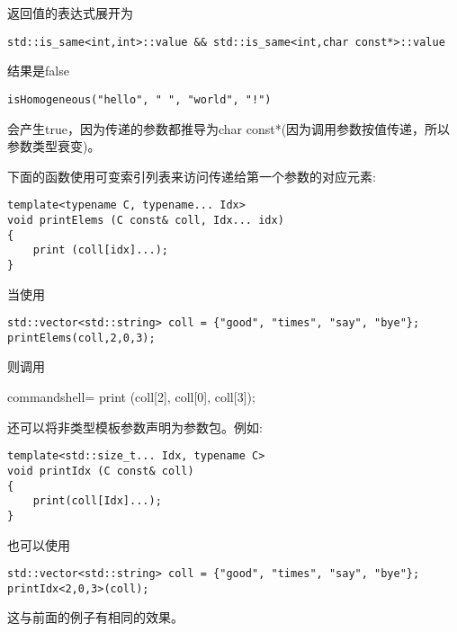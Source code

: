 返回值的表达式展开为

\begin{lstlisting}[style=styleCXX]
std::is_same<int,int>::value && std::is_same<int,char const*>::value
\end{lstlisting}

结果是false

\begin{lstlisting}[style=styleCXX]
isHomogeneous("hello", " ", "world", "!")
\end{lstlisting}

会产生true，因为传递的参数都推导为char const*(因为调用参数按值传递，所以参数类型衰变)。


下面的函数使用可变索引列表来访问传递给第一个参数的对应元素:

\begin{lstlisting}[style=styleCXX]
template<typename C, typename... Idx>
void printElems (C const& coll, Idx... idx)
{
	print (coll[idx]...);
}
\end{lstlisting}

当使用

\begin{lstlisting}[style=styleCXX]
std::vector<std::string> coll = {"good", "times", "say", "bye"};
printElems(coll,2,0,3);
\end{lstlisting}

则调用

\begin{tcblisting}{commandshell={}}
print (coll[2], coll[0], coll[3]);
\end{tcblisting}

还可以将非类型模板参数声明为参数包。例如:

\begin{lstlisting}[style=styleCXX]
template<std::size_t... Idx, typename C>
void printIdx (C const& coll)
{
	print(coll[Idx]...);
}
\end{lstlisting}

也可以使用

\begin{lstlisting}[style=styleCXX]
std::vector<std::string> coll = {"good", "times", "say", "bye"};
printIdx<2,0,3>(coll);
\end{lstlisting}

这与前面的例子有相同的效果。


